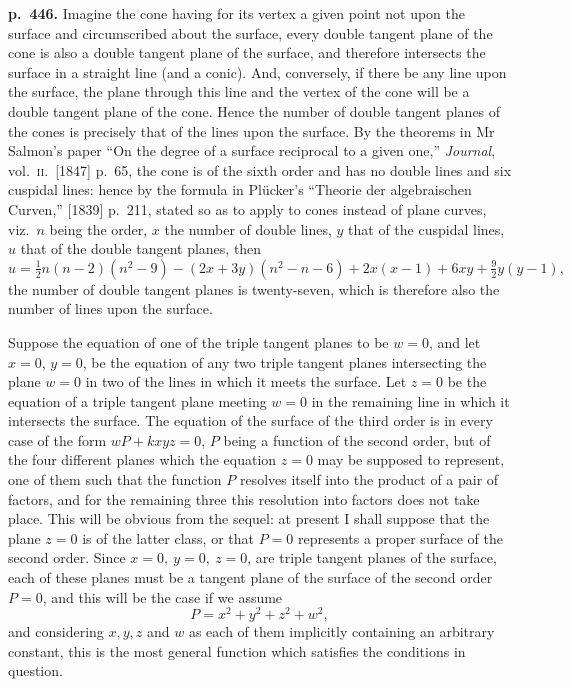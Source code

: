 \documentclass[11pt]{article}
\begin{document}
\bigskip
\noindent\textbf{p.~446.} Imagine the cone having for its vertex a given point not upon the surface and circumscribed about the surface, every double tangent plane of the cone is also a double tangent plane of the surface, and therefore intersects the surface in a straight line (and a conic). And, conversely, if there be any line upon the surface, the plane through this line and the vertex of the cone will be a double tangent plane of the cone. Hence the number of double tangent planes of the cones is precisely that of the lines upon the surface. By the theorems in Mr Salmon's paper ``On the degree of a surface reciprocal to a given one,'' \textit{Journal}, vol.~\textsc{ii}.\ [1847] p.~65, the cone is of the sixth order and has no double lines and six cuspidal lines: hence by the formula in Pl\"ucker's ``Theorie der algebraischen Curven,'' [1839] p.~211, stated so as to apply to cones instead of plane curves, viz.\ $n$ being the order, $x$ the number of double lines, $y$ that of the cuspidal lines, $u$ that of the double tangent planes, then
\[ u = \tfrac{1}{2}n(n-2)(n^2-9) - (2x + 3y)(n^2 - n - 6) + 2x(x - 1) + 6xy + \tfrac{9}{2}y(y - 1), \]
the number of double tangent planes is twenty-seven, which is therefore also the number of lines upon the surface.

Suppose the equation of one of the triple tangent planes to be $w = 0$, and let $x = 0$, $y = 0$, be the equation of any two triple tangent planes intersecting the plane $w = 0$ in two of the lines in which it meets the surface. Let $z = 0$ be the equation of a triple tangent plane meeting $w = 0$ in the remaining line in which it intersects the surface. The equation of the surface of the third order is in every case of the form $wP + kxyz = 0$, $P$ being a function of the second order, but of the four different planes which the equation $z = 0$ may be supposed to represent, one of them such that the function $P$ resolves itself into the product of a pair of factors, and for the remaining three this resolution into factors does not take place. This will be obvious from the sequel: at present I shall suppose that the plane $z = 0$ is of the latter class, or that $P = 0$ represents a proper surface of the second order. Since $x = 0,\ y = 0,\ z = 0$, are triple tangent planes of the surface, each of these planes must be a tangent plane of the surface of the second order $P = 0$, and this will be the case if we assume
\[ P = x^2 + y^2 + z^2 + w^2, \]
and considering $x, y, z$ and $w$ as each of them implicitly containing an arbitrary constant, this is the most general function which satisfies the conditions in question.
\end{document}
